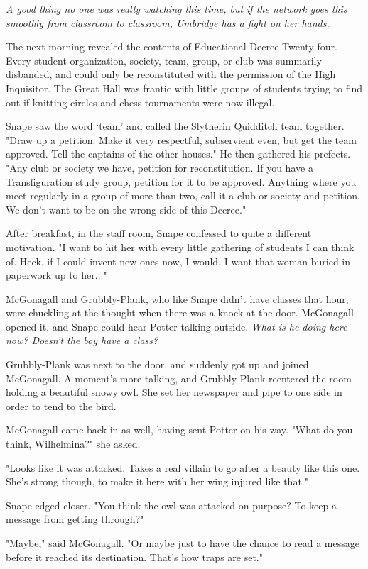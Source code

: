 \documentclass[a4paper,11pt]{article}
\begin{document}
\emph{A good thing no one was really watching this time, but if the network goes this smoothly from classroom to classroom, Umbridge has a fight on her hands.}

The next morning revealed the contents of Educational Decree Twenty-four. Every student organization, society, team, group, or club was summarily disbanded, and could only be reconstituted with the permission of the High Inquisitor. The Great Hall was frantic with little groups of students trying to find out if knitting circles and chess tournaments were now illegal.

Snape saw the word `team' and called the Slytherin Quidditch team together. "Draw up a petition. Make it very respectful, subservient even, but get the team approved. Tell the captains of the other houses." He then gathered his prefects. "Any club or society we have, petition for reconstitution. If you have a Transfiguration study group, petition for it to be approved. Anything where you meet regularly in a group of more than two, call it a club or society and petition. We don't want to be on the wrong side of this Decree."

After breakfast, in the staff room, Snape confessed to quite a different motivation. "I want to hit her with every little gathering of students I can think of. Heck, if I could invent new ones now, I would. I want that woman buried in paperwork up to her..."

McGonagall and Grubbly-Plank, who like Snape didn't have classes that hour, were chuckling at the thought when there was a knock at the door. McGonagall opened it, and Snape could hear Potter talking outside. \emph{What is he doing here now? Doesn't the boy have a class?}

Grubbly-Plank was next to the door, and suddenly got up and joined McGonagall. A moment's more talking, and Grubbly-Plank reentered the room holding a beautiful snowy owl. She set her newspaper and pipe to one side in order to tend to the bird.

McGonagall came back in as well, having sent Potter on his way. "What do you think, Wilhelmina?" she asked.

"Looks like it was attacked. Takes a real villain to go after a beauty like this one. She's strong though, to make it here with her wing injured like that."

Snape edged closer. "You think the owl was attacked on purpose? To keep a message from getting through?"

"Maybe," said McGonagall. "Or maybe just to have the chance to read a message before it reached its destination. That's how traps are set."
\end{document}
